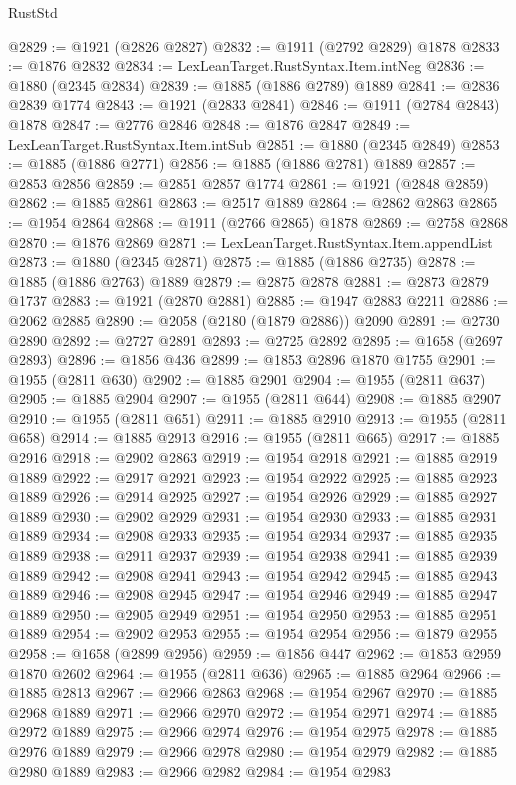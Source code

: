 \begin{lexlean}{RustStd}
\begin{coremodule}
@2829 := @1921 (@2826 @2827)
@2832 := @1911 (@2792 @2829) @1878
@2833 := @1876 @2832
@2834 := LexLeanTarget.RustSyntax.Item.intNeg
@2836 := @1880 (@2345 @2834)
@2839 := @1885 (@1886 @2789) @1889
@2841 := @2836 @2839 @1774
@2843 := @1921 (@2833 @2841)
@2846 := @1911 (@2784 @2843) @1878
@2847 := @2776 @2846
@2848 := @1876 @2847
@2849 := LexLeanTarget.RustSyntax.Item.intSub
@2851 := @1880 (@2345 @2849)
@2853 := @1885 (@1886 @2771)
@2856 := @1885 (@1886 @2781) @1889
@2857 := @2853 @2856
@2859 := @2851 @2857 @1774
@2861 := @1921 (@2848 @2859)
@2862 := @1885 @2861
@2863 := @2517 @1889
@2864 := @2862 @2863
@2865 := @1954 @2864
@2868 := @1911 (@2766 @2865) @1878
@2869 := @2758 @2868
@2870 := @1876 @2869
@2871 := LexLeanTarget.RustSyntax.Item.appendList
@2873 := @1880 (@2345 @2871)
@2875 := @1885 (@1886 @2735)
@2878 := @1885 (@1886 @2763) @1889
@2879 := @2875 @2878
@2881 := @2873 @2879 @1737
@2883 := @1921 (@2870 @2881)
@2885 := @1947 @2883 @2211
@2886 := @2062 @2885
@2890 := @2058 (@2180 (@1879 @2886)) @2090
@2891 := @2730 @2890
@2892 := @2727 @2891
@2893 := @2725 @2892
@2895 := @1658 (@2697 @2893)
@2896 := @1856 @436
@2899 := @1853 @2896 @1870 @1755
@2901 := @1955 (@2811 @630)
@2902 := @1885 @2901
@2904 := @1955 (@2811 @637)
@2905 := @1885 @2904
@2907 := @1955 (@2811 @644)
@2908 := @1885 @2907
@2910 := @1955 (@2811 @651)
@2911 := @1885 @2910
@2913 := @1955 (@2811 @658)
@2914 := @1885 @2913
@2916 := @1955 (@2811 @665)
@2917 := @1885 @2916
@2918 := @2902 @2863
@2919 := @1954 @2918
@2921 := @1885 @2919 @1889
@2922 := @2917 @2921
@2923 := @1954 @2922
@2925 := @1885 @2923 @1889
@2926 := @2914 @2925
@2927 := @1954 @2926
@2929 := @1885 @2927 @1889
@2930 := @2902 @2929
@2931 := @1954 @2930
@2933 := @1885 @2931 @1889
@2934 := @2908 @2933
@2935 := @1954 @2934
@2937 := @1885 @2935 @1889
@2938 := @2911 @2937
@2939 := @1954 @2938
@2941 := @1885 @2939 @1889
@2942 := @2908 @2941
@2943 := @1954 @2942
@2945 := @1885 @2943 @1889
@2946 := @2908 @2945
@2947 := @1954 @2946
@2949 := @1885 @2947 @1889
@2950 := @2905 @2949
@2951 := @1954 @2950
@2953 := @1885 @2951 @1889
@2954 := @2902 @2953
@2955 := @1954 @2954
@2956 := @1879 @2955
@2958 := @1658 (@2899 @2956)
@2959 := @1856 @447
@2962 := @1853 @2959 @1870 @2602
@2964 := @1955 (@2811 @636)
@2965 := @1885 @2964
@2966 := @1885 @2813
@2967 := @2966 @2863
@2968 := @1954 @2967
@2970 := @1885 @2968 @1889
@2971 := @2966 @2970
@2972 := @1954 @2971
@2974 := @1885 @2972 @1889
@2975 := @2966 @2974
@2976 := @1954 @2975
@2978 := @1885 @2976 @1889
@2979 := @2966 @2978
@2980 := @1954 @2979
@2982 := @1885 @2980 @1889
@2983 := @2966 @2982
@2984 := @1954 @2983

\end{coremodule}
\end{lexlean}
